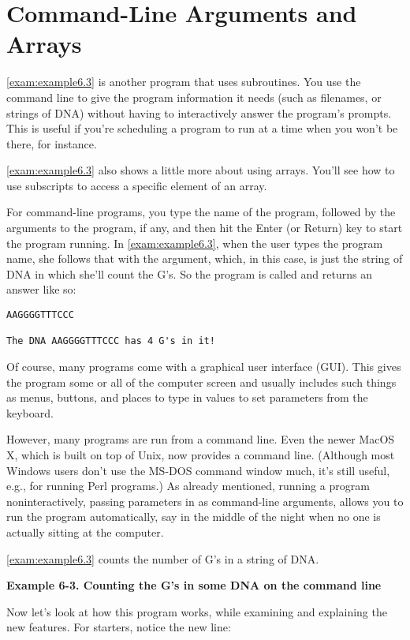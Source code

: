 \section{Command-Line Arguments and Arrays}
\autoref{exam:example6.3} is another program that uses subroutines. You use the command line to give the program information it needs (such as filenames, or strings of DNA) without having to interactively answer the program's prompts. This is useful if you're scheduling a program to run at a time when you won't be there, for instance.

\autoref{exam:example6.3} also shows a little more about using arrays. You'll see how to use subscripts to access a specific element of an array.

For command-line programs, you type the name of the program, followed by the arguments to the program, if any, and then hit the Enter (or Return) key to start the program running. In \autoref{exam:example6.3}, when the user types the program name, she follows that with the argument, which, in this case, is just the string of DNA in which she'll count the G's. So the program is called and returns an answer like so:

\begin{lstlisting}
AAGGGGTTTCCC

The DNA AAGGGGTTTCCC has 4 G's in it!
\end{lstlisting}

Of course, many programs come with a graphical user interface (GUI). This gives the program some or all of the computer screen and usually includes such things as menus, buttons, and places to type in values to set parameters from the keyboard.

However, many programs are run from a command line. Even the newer MacOS X, which is built on top of Unix, now provides a command line. (Although most Windows users don't use the MS-DOS command window much, it's still useful, e.g., for running Perl programs.) As already mentioned, running a program noninteractively, passing parameters in as command-line arguments, allows you to run the program automatically, say in the middle of the night when no one is actually sitting at the computer.  

\autoref{exam:example6.3} counts the number of G's in a string of DNA. 

\textbf{Example 6-3. Counting the G's in some DNA on the command line}


Now let's look at how this program works, while examining and explaining the new features. For starters, notice the new line:

